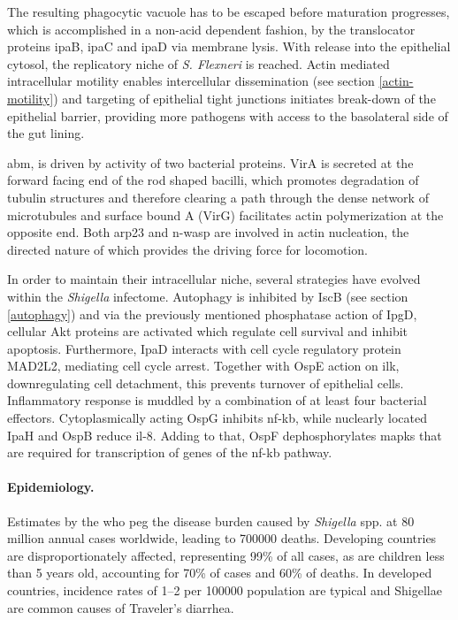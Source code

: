 The resulting phagocytic vacuole has to be escaped before maturation progresses, which is accomplished in a non-acid dependent fashion, by the translocator proteins \acrshort{ipa}B, \acrshort{ipa}C and \acrshort{ipa}D via membrane lysis. With release into the epithelial cytosol, the replicatory niche of \textit{S. Flexneri} is reached. Actin mediated intracellular motility enables intercellular dissemination (see section \ref{actin-motility}) and targeting of epithelial tight junctions initiates break-down of the epithelial barrier, providing more pathogens with access to the basolateral side of the gut lining.

\Gls{abm}, is driven by activity of two bacterial proteins. VirA is secreted at the forward facing end of the rod shaped bacilli, which promotes degradation of tubulin structures and therefore clearing a path through the dense network of microtubules and surface bound A (VirG) facilitates actin polymerization at the opposite end. Both \gls{arp23} and \gls{n-wasp} are involved in actin nucleation, the directed nature of which provides the driving force for locomotion.

In order to maintain their intracellular niche, several strategies have evolved within the \textit{Shigella} infectome. Autophagy is inhibited by IscB (see section \ref{autophagy}) and via the previously mentioned phosphatase action of IpgD, cellular Akt proteins are activated which regulate cell survival and inhibit apoptosis. Furthermore, IpaD interacts with cell cycle regulatory protein MAD2L2, mediating cell cycle arrest. Together with OspE action on \gls{ilk}, downregulating cell detachment, this prevents turnover of epithelial cells. Inflammatory response is muddled by a combination of at least four bacterial effectors. Cytoplasmically acting OspG inhibits \gls{nf-kb}, while nuclearly located IpaH and OspB reduce \gls{il-8}. Adding to that, OspF dephosphorylates \glspl{mapk} that are required for transcription of genes of the \gls{nf-kb} pathway.

\paragraph{Epidemiology.}
Estimates by the \gls{who} peg the disease burden caused by \textit{Shigella} spp. at 80 million annual cases worldwide, leading to 700000 deaths. Developing countries are disproportionately affected, representing 99\% of all cases, as are children less than 5 years old, accounting for 70\% of cases and 60\% of deaths. In developed countries, incidence rates of 1--2 per 100000 population are typical and Shigellae are common causes of Traveler's diarrhea.

